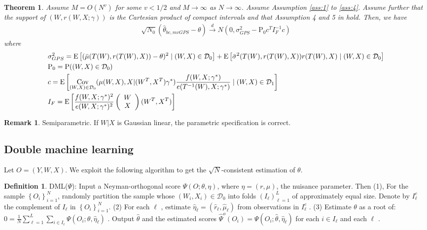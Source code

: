 \documentclass[11pt]{article}
\def\P{{\mathrm P}}
\def\E{{\mathrm E}}
\numberwithin{equation}{section}
\newtheorem{theorem}{Theorem}[section]
\theoremstyle{definition}
\newtheorem{definition}{Definition}[section]
\newtheorem{remark}{Remark}[section]
\begin{document}
\begin{theorem}\label{thm:2}
    Assume $M=O(N^v)$ for some $v<1/2$ and $M\to\infty$ as $N\to\infty$. Assume Assumption \ref{ass:1} to \ref{ass:4}. Assume further that the support of $(W,r(W,X;\gamma))$ is the Cartesian product of compact intervals and that Assumption 4 and 5 in \cite{abadie2016matching} hold. Then, we have
\begin{align}
    \sqrt{N_0}(\widehat{\theta}_{bc,mvGPS}-\theta)\overset{d}{\to} N(0,\sigma_{GPS}^2-\P_0c^{T}I_F^{-1}c)   
\end{align}
where 
\begin{align}
    &\sigma_{GPS}^2=\E\left[(\bar{\mu}(T(W),r(T(W),X))-\theta)^2\mid (W,X)\in\mathcal{D}_0\right]+ \E\left[\bar{\sigma}^2(T(W),r(T(W),X))r(T(W),X)\mid (W,X)\in\mathcal{D}_0\right]\\
    &\P_0=\P((W,X)\in\mathcal{D}_0)\\
    &c=\E\left[\Cov_{(W,X)\in\mathcal{D}_0}(\mu(W,X),X|(W^T,X^T)\gamma^*)\frac{f(W,X;\gamma^*)}{e(T^{-1}(W),X;\gamma^*)}\mid (W,X)\in\mathcal{D}_1\right]\\
    &I_F=\E\left[\frac{f(W,X;\gamma^*)^2}{e(W,X;\gamma^*)^2}\left(\begin{array}{c}
         W \\
         X 
    \end{array}\right)(W^T,X^T)\right]
\end{align}
\end{theorem}
\begin{remark}
    Semiparametric. If $W|X$ is Gaussian linear, the parametric specification is correct.
\end{remark}
\subsection{Double machine learning}
Let $O=(Y,W,X)$. We exploit the following algorithm to get the $\sqrt{N}$-consistent estimation of $\theta$. 

\begin{definition}
DML($\Psi$): Input a Neyman-orthogonal score  $\Psi(O; \theta, \eta)$, where  $\eta=(r,\mu)$, the nuisance parameter. Then (1), For the sample  $\left\{O_{i}\right\}_{i=1}^{N}$, randomly partition the sample whose $(W_i,X_i)\in\mathcal{D}_0$ into folds  $\left(I_{\ell}\right)_{\ell=1}^{L}$  of approximately equal size. Denote by  $I_{\ell}^{c}$  the complement of  $I_{\ell}$ in $\left\{O_{i}\right\}_{i=1}^{N}$. (2) For each  $\ell$ , estimate  $\widehat{\eta}_{\ell}=(\widehat{r}_{\ell}, \widehat{\mu}_{\ell})$  from observations in  $I_{\ell}^{c}$ . (3) Estimate  $\theta$  as a root of:  $0=\frac{1}{N}\sum_{\ell=1}^{L} \sum_{i \in I_{\ell}} \Psi\left(O_{i} ;\theta, \widehat{\eta}_{\ell}\right)$ . Output  $\widehat{\theta}$  and the estimated scores  $\widehat{\Psi}^{o}\left(O_{i}\right)=\Psi\left(O_{i} ; \widehat{\theta},\widehat{\eta}_{\ell}\right)$  for each  $i \in I_{\ell}$ and each  $\ell$ .
\end{definition}
\end{document}
